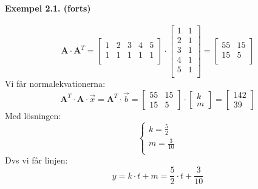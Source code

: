 \begin{mdframed}
\paragraph{Exempel 2.1. (forts)} %
\label{par:exempel_2_1_}
\[
    \mathbf{A} \cdot \mathbf{A}^T = 
    \begin{bmatrix}
    1 & 2 & 3 & 4 & 5\\
    1 & 1 & 1 & 1 & 1\\
    \end{bmatrix} \cdot
    \begin{bmatrix}
    1 & 1\\
    2 & 1\\
    3 & 1\\
    4 & 1\\
    5 & 1\\
    \end{bmatrix} = 
    \begin{bmatrix}
    55 & 15\\
    15 & 5\\
    \end{bmatrix}
\]
Vi får normalekvationerna:
\[
    \mathbf{A}^T \cdot \mathbf{A} \cdot \vec{x} = \mathbf{A}^T \cdot \vec{b} = \begin{bmatrix} 55&15\\15&5 \end{bmatrix} \cdot \begin{bmatrix} k\\m \end{bmatrix} = \begin{bmatrix} 142\\39 \end{bmatrix}
\]
Med lösningen:
\[
    \begin{cases}
    	k = \frac{5}{2}\\
    	m = \frac{3}{10}\\
    \end{cases}
\]
Dvs vi får linjen:
\[
    y = k \cdot t + m = \frac{5}{2} \cdot t + \frac{3}{10}
\]
\end{mdframed}
